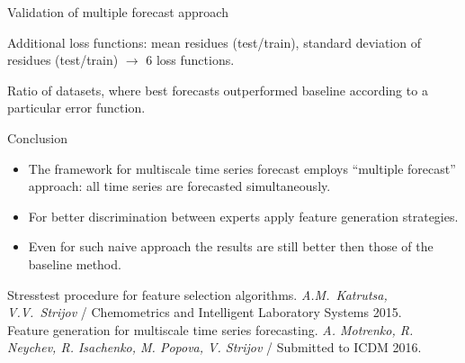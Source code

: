 \documentclass{beamer}
\begin{document}
%
%
\begin{frame}{Validation of multiple forecast approach}

Additional loss functions: mean residues (test/train), standard deviation of residues (test/train) $\rightarrow$ 6 loss functions.


Ratio of datasets, where best forecasts outperformed baseline according to a particular error function.

\end{frame}
\begin{frame}{Conclusion}

\begin{itemize}
\item The framework for multiscale time series forecast employs ``multiple forecast'' approach: all time series are forecasted simultaneously.
\item For better discrimination between experts apply feature generation strategies.         
\item Even for such naive approach the results are still better then those of the baseline method.
\end{itemize}

\medskip
Stresstest procedure for feature selection algorithms. \emph{A.M.~Katrutsa, V.V.~Strijov} /  Chemometrics and Intelligent Laboratory Systems 2015. \\
Feature generation for multiscale time series forecasting. \emph{A. Motrenko, R. Neychev, R. Isachenko, M. Popova, V. Strijov} / Submitted to ICDM 2016.

\end{frame}
\end{document}
